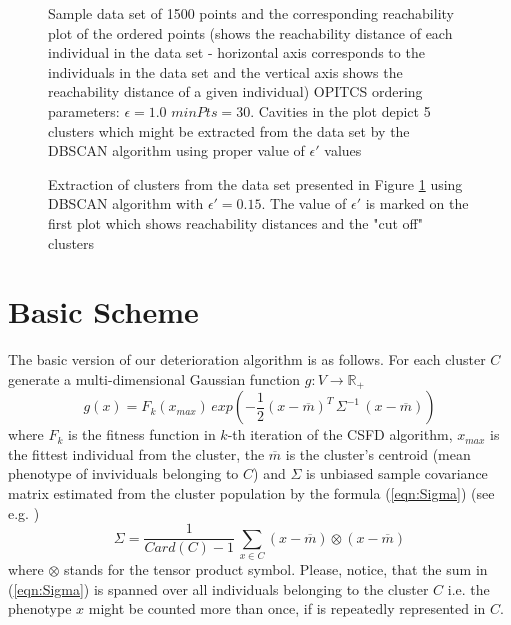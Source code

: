 \begin{figure}
  \centering
  \caption{Sample data set of 1500 points and the corresponding reachability plot
  of the ordered points (shows the reachability distance of each individual in the
  data set - horizontal axis corresponds to the individuals in the data set and
  the vertical axis shows the reachability distance of a given individual)
  OPITCS ordering parameters: $\epsilon=1.0$ $minPts=30$. 
  Cavities in the plot depict 5 clusters which might be extracted from the data
  set by the DBSCAN algorithm using proper value of $\epsilon'$ values}
  \label{fig:opticsOrder1}
\end{figure}

\begin{figure}
  \centering
  \caption{Extraction of clusters from the data set presented in Figure
  \ref{fig:opticsOrder1} using DBSCAN algorithm with 
  $\epsilon'=0.15$. The value of $\epsilon'$ is marked on the first
  plot which shows reachability distances and the "cut off" clusters}
  \label{fig:opticsOrder2}
\end{figure}
 


\section{Basic Scheme}
\label{sec:BasScheme}

The basic version of our deterioration algorithm is as follows.
For each cluster $C$ generate a multi-dimensional Gaussian function
$g: V \rightarrow \mathbb{R}_+$
\begin{equation}
\label{eqn:GF}
g(x)= F_k(x_{max}) \,  exp \left(
 - \frac{1}{2}(x - \overline{m})^T \, \Sigma^{-1} \, (x - \overline{m})
\right)
\end{equation}
where $F_k$ is the fitness function in $k$-th iteration of the CSFD algorithm,
$x_{max}$ is the fittest individual from the cluster, the $\overline{m}$ is the
cluster's centroid (mean phenotype of invividuals belonging to $C$)
and $\Sigma$ is unbiased sample covariance matrix
estimated from the cluster population by the formula (\ref{eqn:Sigma})
(see e.g. \cite{SampleCovariance})
\begin{equation}
\label{eqn:Sigma}
\Sigma = \frac{1}{Card(C) - 1} \, \sum_{x \in C} 
(x - \overline{m}) \otimes (x - \overline{m})
\end{equation}
where $\otimes$ stands for the tensor product symbol. Please, notice, that
the sum in (\ref{eqn:Sigma}) is spanned over all individuals belonging
to the cluster $C$ i.e. the phenotype $x$ might be counted more than once,
if is repeatedly represented in $C$.



